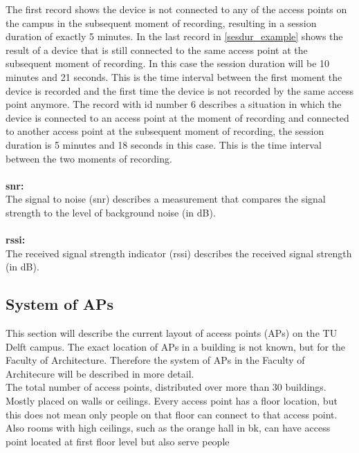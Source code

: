                                                                                                                                                                                                                                                                                                                                                                                                                                                                                                                                                                                                                                                                                                                                                                                                                                                    
The first record shows the device is not connected to any of the access points on the campus in the subsequent moment of recording, resulting in a session duration of exactly 5 minutes. In the last record in \autoref{sesdur_example} shows the result of a device that is still connected to the same access point at the subsequent moment of recording. In this case the session duration will be 10 minutes and 21 seconds. This is the time interval between the first moment the device is recorded and the first time the device is not recorded by the same access point anymore. The record with id number 6 describes a situation in which the device is connected to an access point at the moment of recording and connected to another access point at the subsequent moment of recording, the session duration is 5 minutes and 18 seconds in this case. This is the time interval between the two moments of recording.\\\\
\textbf{snr:}\\
The signal to noise (snr) describes a measurement that compares the signal strength to the level of background noise (in dB).\\\\
\textbf{rssi:} \\
The received signal strength indicator (rssi) describes the received signal strength (in dB).

\subsection{System of APs}\label{systemofaps}
This section will describe the current layout of access points (APs) on the TU Delft campus. The exact location of APs in a building is not known, but for the Faculty of Architecture. Therefore the system of APs in the Faculty of Architecure will be described in more detail. 
\\
The total number of access points, distributed over more than 30 buildings. 
Mostly placed on walls or ceilings. Every access point has a floor location, but this does not mean only people on that floor can connect to that access point. Also rooms with high ceilings, such as the orange hall in bk, can have access point located at first floor level but also serve people 

